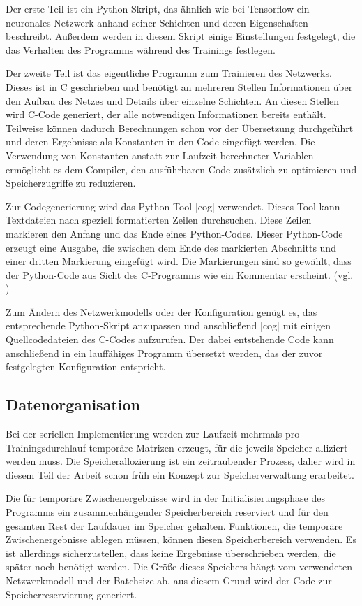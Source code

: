 \documentclass[../main.tex]{subfiles}
\begin{document}
Der erste Teil ist ein Python-Skript, das ähnlich wie bei Tensorflow ein neuronales Netzwerk anhand seiner Schichten und deren Eigenschaften beschreibt. Außerdem werden in diesem Skript einige Einstellungen festgelegt, die das Verhalten des Programms während des Trainings festlegen. 

Der zweite Teil ist das eigentliche Programm zum Trainieren des Netzwerks. Dieses ist in C geschrieben und benötigt an mehreren Stellen Informationen über den Aufbau des Netzes und Details über einzelne Schichten. An diesen Stellen wird C-Code generiert, der alle notwendigen Informationen bereits enthält. Teilweise können dadurch Berechnungen schon vor der Übersetzung durchgeführt und deren Ergebnisse als Konstanten in den Code eingefügt werden. Die Verwendung von Konstanten anstatt zur Laufzeit berechneter Variablen ermöglicht es dem Compiler, den ausführbaren Code zusätzlich zu optimieren und Speicherzugriffe zu reduzieren. 

Zur Codegenerierung wird das Python-Tool |cog| verwendet. Dieses Tool kann Textdateien nach speziell formatierten Zeilen durchsuchen. Diese Zeilen markieren den Anfang und das Ende eines Python-Codes. Dieser Python-Code erzeugt eine Ausgabe, die zwischen dem Ende des markierten Abschnitts und einer dritten Markierung eingefügt wird. Die Markierungen sind so gewählt, dass der Python-Code aus Sicht des C-Programms wie ein Kommentar erscheint. (vgl. \cite{COGdocumentation})

Zum Ändern des Netzwerkmodells oder der Konfiguration genügt es, das entsprechende Python-Skript anzupassen und anschließend |cog| mit einigen Quellcodedateien des C-Codes aufzurufen. Der dabei entstehende Code kann anschließend in ein lauffähiges Programm übersetzt werden, das der zuvor festgelegten Konfiguration entspricht. 

\subsection{Datenorganisation}
Bei der seriellen Implementierung werden zur Laufzeit mehrmals pro Trainingsdurchlauf temporäre Matrizen erzeugt, für die jeweils Speicher alliziert werden muss. Die Speicherallozierung ist ein zeitraubender Prozess, daher wird in diesem Teil der Arbeit schon früh ein Konzept zur Speicherverwaltung erarbeitet. 

Die für temporäre Zwischenergebnisse wird in der Initialisierungsphase des Programms ein zusammenhängender Speicherbereich reserviert und für den gesamten Rest der Laufdauer im Speicher gehalten. Funktionen, die temporäre Zwischenergebnisse ablegen müssen, können diesen Speicherbereich verwenden. Es ist allerdings sicherzustellen, dass keine Ergebnisse überschrieben werden, die später noch benötigt werden. Die Größe dieses Speichers hängt vom verwendeten Netzwerkmodell und der Batchsize ab, aus diesem Grund wird der Code zur Speicherreservierung generiert. 
\end{document}
